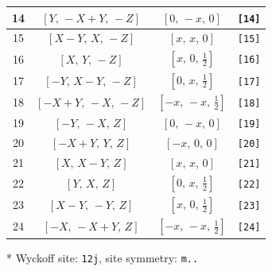 \documentclass[fleqn,8pt]{jsarticle}
\begin{document}
\begin{longtable}{cccc}
14 & $\left[ Y,\, - X + Y,\, - Z \right]$ & $\left[ 0,\, - x,\, 0 \right]$ & {\tt [14]} \\ \hline
15 & $\left[ X - Y,\, X,\, - Z \right]$ & $\left[ x,\, x,\, 0 \right]$ & {\tt [15]} \\ \hline
16 & $\left[ X,\, Y,\, - Z \right]$ & $\left[ x,\, 0,\, \frac{1}{2} \right]$ & {\tt [16]} \\ \hline
17 & $\left[ - Y,\, X - Y,\, - Z \right]$ & $\left[ 0,\, x,\, \frac{1}{2} \right]$ & {\tt [17]} \\ \hline
18 & $\left[ - X + Y,\, - X,\, - Z \right]$ & $\left[ - x,\, - x,\, \frac{1}{2} \right]$ & {\tt [18]} \\ \hline
19 & $\left[ - Y,\, - X,\, Z \right]$ & $\left[ 0,\, - x,\, 0 \right]$ & {\tt [19]} \\ \hline
20 & $\left[ - X + Y,\, Y,\, Z \right]$ & $\left[ - x,\, 0,\, 0 \right]$ & {\tt [20]} \\ \hline
21 & $\left[ X,\, X - Y,\, Z \right]$ & $\left[ x,\, x,\, 0 \right]$ & {\tt [21]} \\ \hline
22 & $\left[ Y,\, X,\, Z \right]$ & $\left[ 0,\, x,\, \frac{1}{2} \right]$ & {\tt [22]} \\ \hline
23 & $\left[ X - Y,\, - Y,\, Z \right]$ & $\left[ x,\, 0,\, \frac{1}{2} \right]$ & {\tt [23]} \\ \hline
24 & $\left[ - X,\, - X + Y,\, Z \right]$ & $\left[ - x,\, - x,\, \frac{1}{2} \right]$ & {\tt [24]} \\
\end{longtable}
* Wyckoff site: {\tt 12j}, site symmetry: {\tt m..}
\renewcommand{\arraystretch}{1.2}
\end{document}
